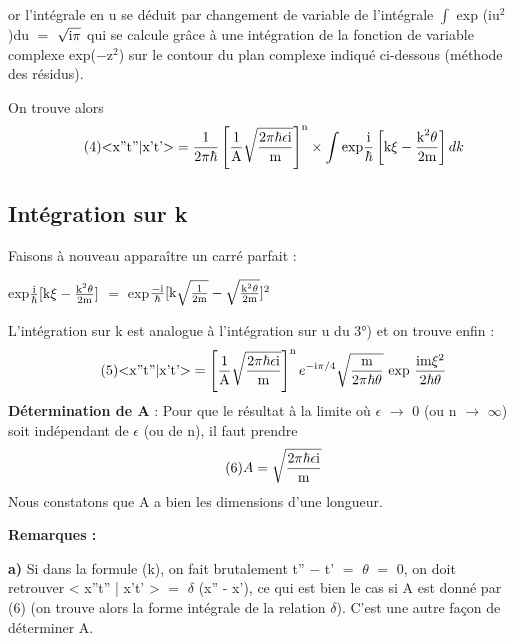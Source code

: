 or l'intégrale en u se déduit par changement de variable de
l'intégrale $\int$ exp (iu$^2$)du $=$ $\sqrt{\text{i}\pi}$ qui se calcule grâce à une intégration
de la fonction de variable complexe exp($-$z$^2$) sur le contour du plan complexe
indiqué ci-dessous (méthode des résidus).
\begin{center}
\end{center}
On trouve alors
\[
\tag{4}\text{<x''t''|x't'>} = \frac{1}{2\pi\hbar} \left[ \frac{1}{\text{A}}
\sqrt{\frac{2\pi\hbar\epsilon\text{i}}{\text{m}}} \right]^{\text{n}}
\times \int \text{exp} \frac{\text{i}}{\hbar}\left[\text{k}\xi-\frac{\text{k}^2\theta}{2\text{m}}\right]dk 
\]

\subsection{Intégration sur k}%

Faisons à nouveau apparaître un carré parfait :
\begin{center}
exp$\frac{\text{i}}{\hbar}[\text{k}\xi-\frac{\text{k}^2\theta}{2\text{m}}]$ $=$
exp$\frac{-\text{i}}{\hbar}[\text{k}\sqrt{\frac{1}{2\text{m}}}-\sqrt{\frac{\text{k}^2\theta}{2\text{m}}}]^2$
\end{center}
L'intégration sur k est analogue à l'intégration sur u du 3°) et on
trouve enfin :
\[
\tag{5}\text{<x''t''|x't'>} =\left[ \frac{1}{\text{A}}
\sqrt{\frac{2\pi\hbar\epsilon\text{i}}{\text{m}}} \right]^{\text{n}}
e^{-\text{i}\pi/4}\sqrt{\frac{\text{m}}{2\pi\hbar\theta}}
\ \text{exp}\ \frac{\text{i}\text{m}\xi^2}{2\hbar\theta}
\]
{\bf Détermination de A} : Pour que le résultat à la limite où  $\epsilon$
$\to$ 0 (ou n $\to$ $\infty$)
soit indépendant de $\epsilon$ (ou de n), il faut prendre
\[
\tag{6} A = \sqrt{\frac{2\pi\hbar\epsilon\text{i}}{\text{m}}}
\]
Nous constatons que A a bien les dimensions d'une longueur.

 
{\bf Remarques :}

{\bf a)} Si dans la formule (k), on fait brutalement t'' $-$ t' $=$ $\theta$ $=$ 0, on doit
retrouver < x''t'' | x't' > $=$ $\delta$ (x'' - x'), ce qui est bien le cas si A est
donné par (6) (on trouve alors la forme intégrale de la relation $\delta$). C'est
une autre façon de déterminer A.

